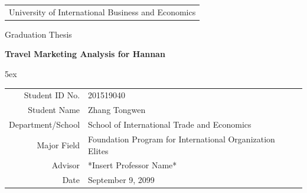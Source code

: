\documentclass[12pt]{ctexart}
\begin{document}
\begin{titlepage}
\begin{center}
\begin{tabular}{c}
\\[0.3ex]
\large{\textcolor{title}{University of International Business and Economics}}\\
[2cm]
\end{tabular}
\hspace{0cm}

 Graduation Thesis

\vspace{2cm}

 \textbf{Travel Marketing Analysis for Hannan}

\vspace{2.8cm}

\textwidth 5ex
\renewcommand\arraystretch{2}
\begin{tabularx}{13cm}{  r Y  } %
\large Student ID No.\xdef\tempwidth{\the\linewidth} & \large{201519040}\\[-1.8ex]
\large Student Name\xdef\tempwidth{\the\linewidth} & \large{Zhang Tongwen}\\[-1.8ex]
\large Department/School\xdef\tempwidth{\the\linewidth} & School of International Trade and Economics\\[-1.8ex] %
\large Major Field\xdef\tempwidth{\the\linewidth} & \footnotesize{Foundation Program for International Organization Elites}\\[-1.8ex] %
\large Advisor\xdef\tempwidth{\the\linewidth} & \large{*Insert Professor Name*}\\[-1.8ex]
\large Date\xdef\tempwidth{\the\linewidth} & \large{September 9, 2099}\\[-1.8ex]
\end{tabularx}
\end{center}


\end{titlepage}
\pagestyle{empty}
\tableofcontents
\newpage
\pagestyle{plain}
\maketitle
\end{document}

